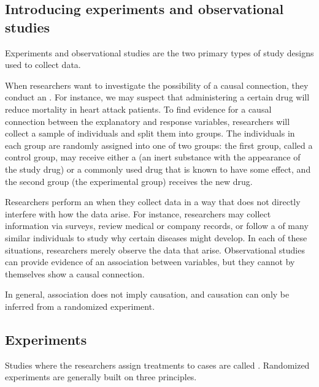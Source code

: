 \begin{doublespace}


\subsection{Introducing experiments and observational studies}

Experiments and observational studies are the two primary types of study designs used to collect data.

When researchers want to investigate the possibility of a causal connection, they conduct an . For instance, we may suspect that administering a certain drug will reduce mortality in heart attack patients. To find evidence for a causal connection between the explanatory and response variables, researchers will collect a sample of individuals and split them into groups. The individuals in each group are randomly assigned into one of two groups: the first group, called a control group, may receive either a  (an inert substance with the appearance of the study drug) or a commonly used drug that is known to have some effect,  and the second group (the experimental group) receives the new drug. 

Researchers perform an  when they collect data in a way that does not directly interfere with how the data arise. For instance, researchers may collect information via surveys, review medical or company records, or follow a  of many similar individuals to study why certain diseases might develop. In each of these situations, researchers merely observe the data that arise. Observational studies can provide evidence of an association between variables, but they cannot by themselves show a causal connection. 

\begin{tipBox}{
In general, association does not imply causation, and causation can only be inferred from a randomized experiment.}
\end{tipBox}

\subsection[Experiments]{Experiments}
\label{experimentsSection}

Studies where the researchers assign treatments to cases are called . Randomized experiments are generally built on three principles.


\end{doublespace}

